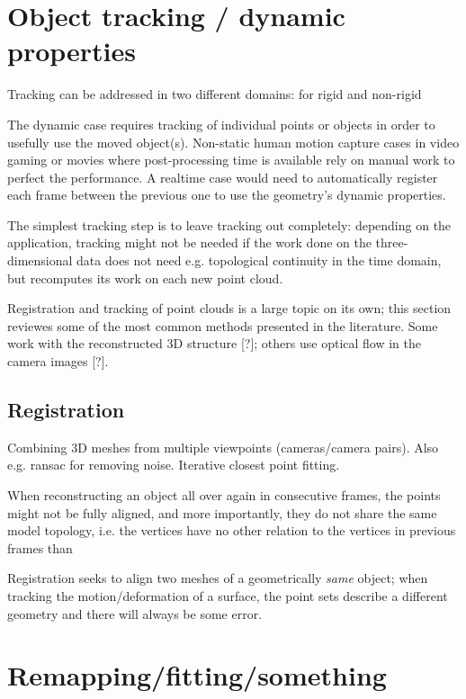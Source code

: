 \section{Object tracking / dynamic properties} \label{sec:tracking}

Tracking can be addressed in two different domains: for rigid and non-rigid 

The dynamic case requires tracking of individual points or objects in order to usefully use the moved object(s).
Non-static human motion capture cases in video gaming or movies where post-processing time is available rely on manual work to perfect the performance.
A realtime case would need to automatically register each frame between the previous one to use the geometry's dynamic properties.

The simplest tracking step is to leave tracking out completely: depending on the application, tracking might not be needed if the work done on the three-dimensional data does not need e.g. topological continuity in the time domain, but recomputes its work on each new point cloud.

Registration and tracking of point clouds is a large topic on its own; this section reviewes some of the most common methods presented in the literature. Some work with the reconstructed 3D structure [?]; others use optical flow in the camera images [?].

\subsection{Registration}

Combining 3D meshes from multiple viewpoints (cameras/camera pairs). Also e.g. ransac for removing noise. Iterative closest point fitting.

When reconstructing an object all over again in consecutive frames, the points might not be fully aligned, and more importantly, they do not share the same model topology, i.e. the vertices have no other relation to the vertices in previous frames than 

Registration seeks to align two meshes of a geometrically \textit{same} object; when tracking the motion/deformation of a surface, the point sets describe a different geometry and there will always be some error.

\section{Remapping/fitting/something}

